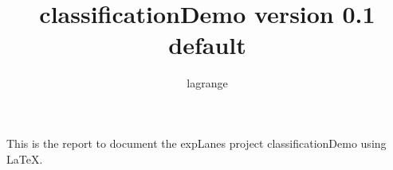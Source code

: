\documentclass[10pt,a4paper,fleqn]{article}
\title{classificationDemo version 0.1\\ default}
\author{ lagrange }
\begin{document}
 
  
\maketitle 
  
  
This is the report to document the expLanes project classificationDemo using \LaTeX. 
  
  
  
% 
% 
  
\end{document}
